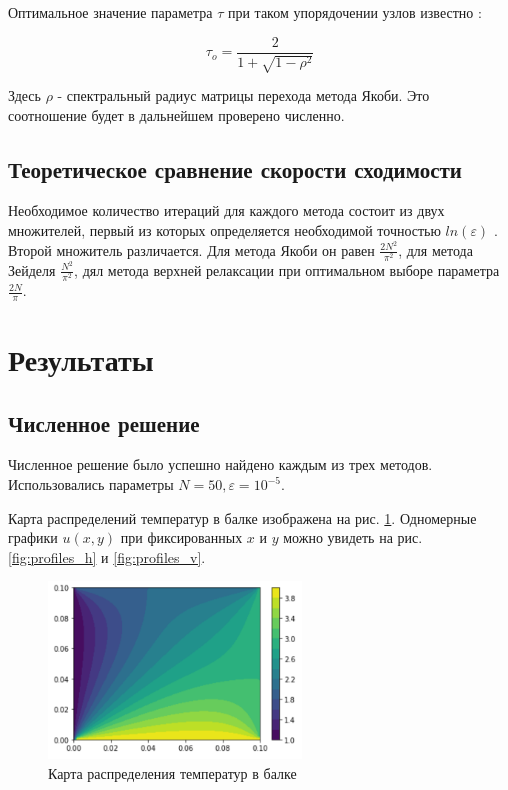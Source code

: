 \documentclass[report , a4paper, onecolumn, 12pt]{article}
\begin{document}
Оптимальное значение параметра $\tau$ при таком упорядочении узлов известно \cite{aristova}:

\begin{equation}
\label{tauo}\tau_o = \frac{2}{1 + \sqrt{1 - \rho^2}}
\end{equation}


Здесь $\rho$ - спектральный радиус матрицы перехода метода Якоби. Это соотношение будет в дальнейшем проверено численно.

\subsection{Теоретическое сравнение скорости сходимости}

Необходимое количество итераций для каждого метода состоит из двух множителей, первый из которых определяется необходимой точностью $ln(\varepsilon)$ \cite{aristova}. Второй множитель различается. Для метода Якоби он равен $\frac{2N^2}{\pi^2}$, для метода Зейделя $\frac{N^2}{\pi^2}$, дял метода верхней релаксации при оптимальном выборе параметра $\frac{2N}{\pi}$.

\section{Результаты}

\subsection{Численное решение}

Численное решение было успешно найдено каждым из трех методов. Использовались параметры \hbox{$N = 50, \varepsilon = 10^{-5}$}. 

Карта распределений температур в балке изображена на рис. \ref{fig:heatmap}. Одномерные графики $u(x, y)$ при фиксированных $x$ и $y$ можно увидеть на рис. \ref{fig:profiles_h} и \ref{fig:profiles_v}.

\begin{figure}[]
    \centering
    \includegraphics[width=0.6\textwidth]{heatmap}
    \caption{Карта распределения температур в балке}
    \label{fig:heatmap}
\end{figure}
\end{document}
